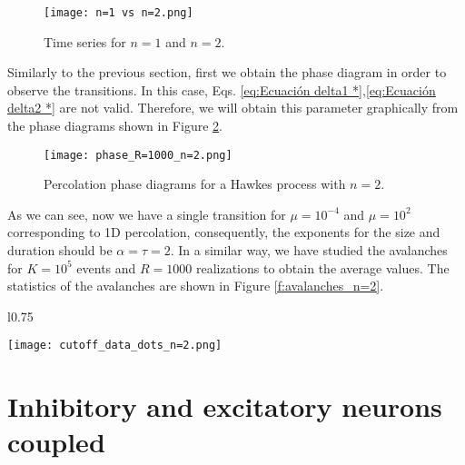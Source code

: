 \begin{figure}[H]
    \centering
    \texttt{[image: n=1 vs n=2.png]}
    \caption{Time series for $n=1$ and $n=2$.}
    \label{f:n=1 vs n=2}
\end{figure}

Similarly to the previous section, first we obtain the phase diagram in order to observe the transitions. In this case, Eqs. \ref{eq:Ecuación delta1 *},\ref{eq:Ecuación delta2 *} are not valid.
Therefore, we will obtain this parameter graphically from the phase diagrams shown in Figure \ref{f:phase_diagram_n=2}.
\begin{figure}[H]
    \centering
    \texttt{[image: phase\_R=1000\_n=2.png]}
    \caption{Percolation phase diagrams for a Hawkes process with $n=2$.}
    \label{f:phase_diagram_n=2}
\end{figure}

As we can see, now we have a single transition for $\mu=10^{-4}$ and $\mu=10^2$ corresponding to 1D percolation, consequently, the exponents for the size and duration 
should be $\alpha=\tau=2$. In a similar way, we have studied the avalanches for $K=10^5$ events and $R=1000$ realizations to obtain the average values. The statistics of the avalanches 
are shown in Figure \ref{f:avalanches_n=2}.


\begin{wrapfigure}{l}{0.75\textwidth}
    \begin{center}
      \texttt{[image: cutoff\_data\_dots\_n=2.png]}
    \end{center}
    \caption{Avalanche statistics for a self-exciting Hawkes process with $n=2$ for $K=10^5$ events averaged over $R=1000$ realizations.}
    \label{f:avalanches_n=2}
\end{wrapfigure}
\clearpage
\section{Inhibitory and excitatory neurons coupled}
